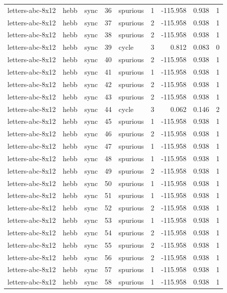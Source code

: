 \begin{tabular}{lllrlrrrr}
letters-abc-8x12 & hebb & sync & 36 & spurious & 1 & -115.958 & 0.938 & 1 \\
letters-abc-8x12 & hebb & sync & 37 & spurious & 2 & -115.958 & 0.938 & 1 \\
letters-abc-8x12 & hebb & sync & 38 & spurious & 2 & -115.958 & 0.938 & 1 \\
letters-abc-8x12 & hebb & sync & 39 & cycle & 3 & 0.812 & 0.083 & 0 \\
letters-abc-8x12 & hebb & sync & 40 & spurious & 2 & -115.958 & 0.938 & 1 \\
letters-abc-8x12 & hebb & sync & 41 & spurious & 1 & -115.958 & 0.938 & 1 \\
letters-abc-8x12 & hebb & sync & 42 & spurious & 2 & -115.958 & 0.938 & 1 \\
letters-abc-8x12 & hebb & sync & 43 & spurious & 2 & -115.958 & 0.938 & 1 \\
letters-abc-8x12 & hebb & sync & 44 & cycle & 3 & 0.062 & 0.146 & 2 \\
letters-abc-8x12 & hebb & sync & 45 & spurious & 1 & -115.958 & 0.938 & 1 \\
letters-abc-8x12 & hebb & sync & 46 & spurious & 2 & -115.958 & 0.938 & 1 \\
letters-abc-8x12 & hebb & sync & 47 & spurious & 1 & -115.958 & 0.938 & 1 \\
letters-abc-8x12 & hebb & sync & 48 & spurious & 1 & -115.958 & 0.938 & 1 \\
letters-abc-8x12 & hebb & sync & 49 & spurious & 2 & -115.958 & 0.938 & 1 \\
letters-abc-8x12 & hebb & sync & 50 & spurious & 1 & -115.958 & 0.938 & 1 \\
letters-abc-8x12 & hebb & sync & 51 & spurious & 1 & -115.958 & 0.938 & 1 \\
letters-abc-8x12 & hebb & sync & 52 & spurious & 2 & -115.958 & 0.938 & 1 \\
letters-abc-8x12 & hebb & sync & 53 & spurious & 1 & -115.958 & 0.938 & 1 \\
letters-abc-8x12 & hebb & sync & 54 & spurious & 2 & -115.958 & 0.938 & 1 \\
letters-abc-8x12 & hebb & sync & 55 & spurious & 2 & -115.958 & 0.938 & 1 \\
letters-abc-8x12 & hebb & sync & 56 & spurious & 2 & -115.958 & 0.938 & 1 \\
letters-abc-8x12 & hebb & sync & 57 & spurious & 1 & -115.958 & 0.938 & 1 \\
letters-abc-8x12 & hebb & sync & 58 & spurious & 1 & -115.958 & 0.938 & 1 \\

\end{tabular}
